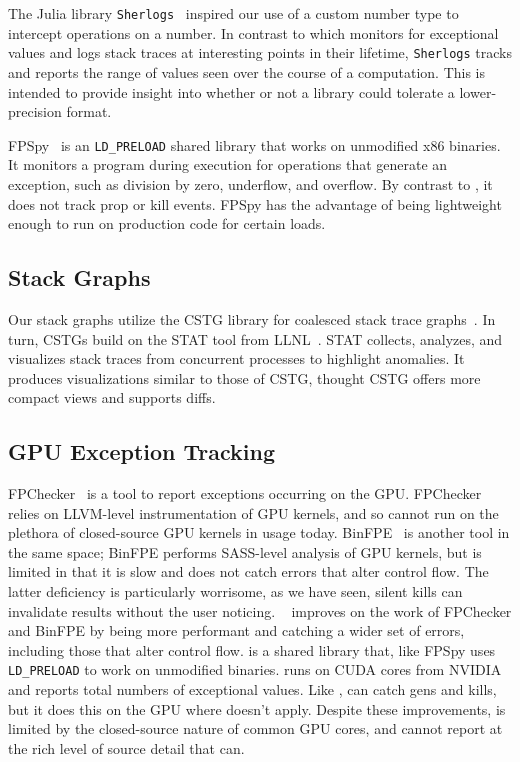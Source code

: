 \documentclass{juliacon}
\begin{document}
The Julia library \texttt{Sherlogs}~\cite{kMilanklSherlogsJl2021} inspired our use of a custom number type to intercept operations on a number.
In contrast to \FT{} which monitors for exceptional values and logs stack traces at interesting points in their lifetime, \texttt{Sherlogs} tracks and reports the range of values seen over the course of a computation.
This is intended to provide insight into whether or not a library could tolerate a lower-precision \fp{} format.

FPSpy~\cite{dindaSpyingFloatingPoint2020} is an \texttt{LD\_PRELOAD} shared library that works on unmodified x86 binaries.
It monitors a program during execution for operations that generate an exception, such as division by zero, underflow, and overflow.
By contrast to \FT{}, it does not track prop or kill events.
FPSpy has the advantage of being lightweight enough to run on production code for certain loads.


\subsection{Stack Graphs}

Our stack graphs utilize the CSTG library for coalesced stack trace graphs~\cite{humphreySystematicDebuggingMethods2014}.
In turn, CSTGs build on the STAT tool from LLNL~\cite{arnoldStackTraceAnalysis2007}.
STAT collects, analyzes, and visualizes stack traces from concurrent processes
to highlight anomalies.
It produces visualizations similar to those of CSTG, thought CSTG offers more compact views and supports diffs.

\subsection{GPU Exception Tracking}

FPChecker~\cite{l-ase-2019} is a tool to report \fp{} exceptions occurring on the GPU.
FPChecker relies on LLVM-level instrumentation of GPU kernels, and so cannot run on the plethora of closed-source GPU kernels in usage today.
BinFPE~\cite{llg-soap-2022} is another tool in the same space;
BinFPE performs SASS-level analysis of GPU kernels, but is limited in that it is slow and does not catch errors that alter control flow.
The latter deficiency is particularly worrisome, as we have seen, silent \NaN{} kills can invalidate results without the user noticing.
\GPUFPX{}~\cite{llsflg-hpdc-2023} improves on the work of FPChecker and BinFPE by being more performant and catching a wider set of errors, including those that alter control flow.
\GPUFPX{} is a shared library that, like FPSpy uses \texttt{LD\_PRELOAD} to work on unmodified binaries.
\GPUFPX{} runs on CUDA cores from NVIDIA and reports total numbers of exceptional values.
Like \FT{}, \GPUFPX{} can catch \NaN{} gens and kills, but it does this on the GPU where \FT{} doesn't apply.
Despite these improvements, \GPUFPX{} is limited by the closed-source nature of common GPU cores, and cannot report at the rich level of source detail that \FT{} can.
\end{document}
